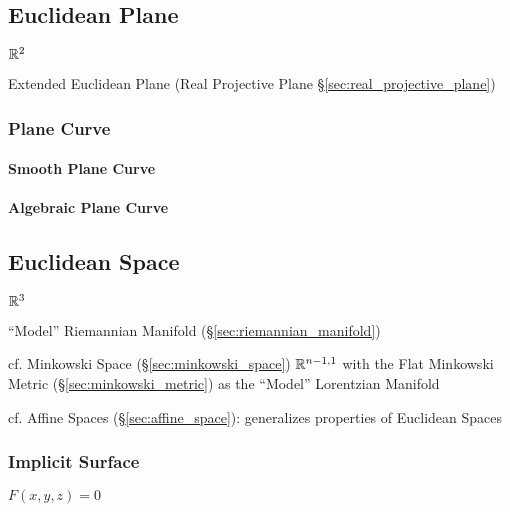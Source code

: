 \subsection{Euclidean Plane}\label{sec:euclidean_plane}

$\mathbb{R}^2$

Extended Euclidean Plane (Real Projective Plane
\S\ref{sec:real_projective_plane})



\subsubsection{Plane Curve}\label{sec:plane_curve}

\paragraph{Smooth Plane Curve}\label{sec:smooth_plane_curve}\hfill

\paragraph{Algebraic Plane Curve}\label{sec:algebraic_plane_curve}\hfill



\subsection{Euclidean Space}\label{sec:euclidean_space}

$\mathbb{R}^3$

``Model'' Riemannian Manifold (\S\ref{sec:riemannian_manifold})

cf. Minkowski Space (\S\ref{sec:minkowski_space}) $\mathbb{R}^{n-1,1}$
with the Flat Minkowski Metric (\S\ref{sec:minkowski_metric}) as the
``Model'' Lorentzian Manifold

cf. Affine Spaces (\S\ref{sec:affine_space}): generalizes properties
of Euclidean Spaces




\subsubsection{Implicit Surface}\label{sec:implicit_surface}

$F(x,y,z) = 0$



